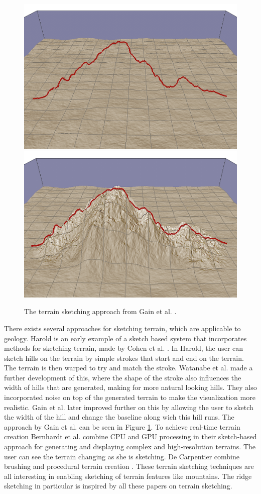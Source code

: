 \documentclass[a4paper,12pt]{report}
\begin{document}
\begin{figure}
\centering
 \includegraphics[width=0.4\linewidth]{thesis/related/img-001.png}
 \includegraphics[width=0.4\linewidth]{thesis/related/img-002.png}
 \caption{The terrain sketching approach from Gain et al. \cite{Gain:2009:TS:1507149.1507155}. }
 \label{fig:gain}
\end{figure}


There exists several approaches for sketching terrain, which are applicable to geology. Harold is an early example of a sketch based system that incorporates methods for sketching terrain, made by Cohen et al. \cite{cohen2000harold}. In Harold, the user can sketch hills on the terrain by simple strokes that start and end on the terrain. The terrain is then warped to try and match the stroke. Watanabe et al.  \cite{Watanabe:2004:SIT:1186415.1186500} made a further development of this, where the shape of the stroke also influences the width of hills that are generated, making for more natural looking hills. They also incorporated noise on top of the generated terrain to make the visualization more realistic. Gain et al. \cite{Gain:2009:TS:1507149.1507155} later improved further on this by allowing the user to sketch the width of the hill and change the baseline along wich this hill runs. The approach by Gain et al. can be seen in Figure \ref{fig:gain}. To achieve real-time terrain creation Bernhardt et al. combine CPU and GPU processing in their sketch-based approach for generating and displaying complex and high-resolution terrains. The user can see the terrain changing as she is sketching. De Carpentier combine brushing and procedural terrain creation \cite{de2009interactive}. These terrain sketching techniques are all interesting in enabling sketching of terrain features like mountains. The ridge sketching in particular is inspired by all these papers on terrain sketching.
\end{document}
